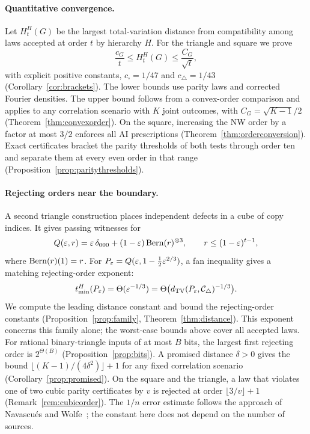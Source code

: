 

\paragraph{Quantitative convergence.}
Let $H_t^H(G)$ be the largest total-variation distance from compatibility among laws accepted at order $t$ by hierarchy $H$. For the triangle and square we prove
\[
\frac{c_G}{t}\le H_t^H(G)\le\frac{C_G}{\sqrt t},
\]
with explicit positive constants, $c_\square=1/47$ and $c_\triangle=1/43$ (Corollary~\ref{cor:brackets}). The lower bounds use parity laws and corrected Fourier densities. The upper bound follows from a convex-order comparison and applies to any correlation scenario with $K$ joint outcomes, with $C_G=\sqrt{K-1}/2$ (Theorem~\ref{thm:convexorder}). On the square, increasing the NW order by a factor at most $3/2$ enforces all AI prescriptions (Theorem~\ref{thm:orderconversion}). Exact certificates bracket the parity thresholds of both tests through order ten and separate them at every even order in that range (Proposition~\ref{prop:paritythresholds}).

\paragraph{Rejecting orders near the boundary.}
A second triangle construction places independent defects in a cube of copy indices. It gives passing witnesses for
\[
Q(\varepsilon,r)=\varepsilon\,\delta_{000}+(1-\varepsilon)\operatorname{Bern}(r)^{\otimes3},
\qquad r\le(1-\varepsilon)^{t-1},
\]
where $\operatorname{Bern}(r)(1)=r$. For $P_\varepsilon=Q(\varepsilon,1-\tfrac12\varepsilon^{2/3})$, a fan inequality gives a matching rejecting-order exponent:
\[
t_{\min}^H(P_\varepsilon)=\Theta(\varepsilon^{-1/3})
=\Theta\bigl(d_{\operatorname{TV}}(P_\varepsilon,\mathcal C_{\triangle})^{-1/3}\bigr).
\]
We compute the leading distance constant and bound the rejecting-order constants (Proposition~\ref{prop:family}, Theorem~\ref{thm:distance}). This exponent concerns this family alone; the worst-case bounds above cover all accepted laws. For rational binary-triangle inputs of at most $B$ bits, the largest first rejecting order is $2^{\Theta(B)}$ (Proposition~\ref{prop:bits}). A promised distance $\delta>0$ gives the bound $\lfloor(K-1)/(4\delta^2)\rfloor+1$ for any fixed correlation scenario (Corollary~\ref{prop:promised}). On the square and the triangle, a law that violates one of two cubic parity certificates by $v$ is rejected at order $\lfloor3/v\rfloor+1$ (Remark~\ref{rem:cubicorder}). The $1/n$ error estimate follows the approach of Navascués and Wolfe~\cite[Theorem 1]{NW2020}; the constant here does not depend on the number of sources.

